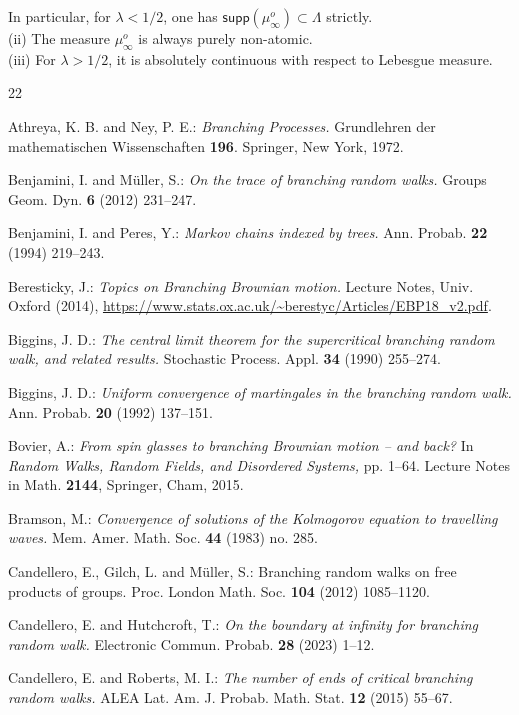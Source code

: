 \documentclass[12pt]{amsart}
\newcommand\Ls{\Lambda}
\numberwithin{theorem}{section}
\theoremstyle{definition}
\begin{document}
In particular, for $\lambda < 1/2$, one has $\mathsf{supp}(\mu_{\infty}^o) \subset \Ls$ strictly.
\\[3pt]
(ii) The measure $\mu_{\infty}^o$ is always purely non-atomic.
\\[3pt]
(iii) For $\lambda > 1/2$, it is absolutely continuous with respect to
Lebesgue measure. 

\begin{thebibliography}{22}  


 Athreya, K. B. and Ney, P. E.: \emph{Branching Processes.}  Grundlehren der 
mathematischen Wissenschaften {\bf 196}. Springer, New York, 1972.

 Benjamini, I. and M\"uller, S.: \emph{On the trace of branching random walks.} 
Groups Geom. Dyn. {\bf 6} (2012) 231--247.

 Benjamini, I. and Peres, Y.: \emph{Markov chains indexed by trees.} Ann. Probab. 
{\bf 22}  (1994) 219--243.

 Beresticky, J.: \emph{Topics on Branching Brownian
motion.} Lecture Notes, Univ. Oxford  (2014), 
\url{https://www.stats.ox.ac.uk/~berestyc/Articles/EBP18_v2.pdf}.

 Biggins, J. D.: \emph{The central limit theorem for the supercritical 
branching random walk, 
and related results.} Stochastic Process. Appl. {\bf 34} (1990)
255--274.

 Biggins, J. D.: \emph{Uniform convergence of martingales in the branching random walk.} Ann. 
Probab. {\bf 20} (1992) 137--151.

 Bovier, A.: \emph{From spin glasses to branching Brownian 
motion -- and back?} In \emph{Random Walks, Random Fields, and Disordered Systems,} pp. 1--64.
Lecture Notes in Math. {\bf 2144}, Springer, Cham, 2015.

 Bramson, M.: \emph{Convergence of solutions of the Kolmogorov 
equation to travelling waves.} Mem. Amer. Math. Soc. {\bf 44} (1983) no. 285.

 Candellero, E., Gilch, L. and M\"uller, S.: {Branching random walks on 
free products of groups.} Proc. London Math. Soc. {\bf 104} (2012) 1085--1120.

 Candellero, E. and Hutchcroft, T.: \emph{On the boundary at infinity for branching 
random walk.} Electronic Commun. Probab. {\bf 28} (2023) 1--12.

 Candellero, E. and Roberts,  M. I.: \emph{The number of ends of critical 
branching random walks.} ALEA Lat. Am. J. Probab. Math. Stat. {\bf 12} (2015) 55--67.


\end{thebibliography}
\end{document}
